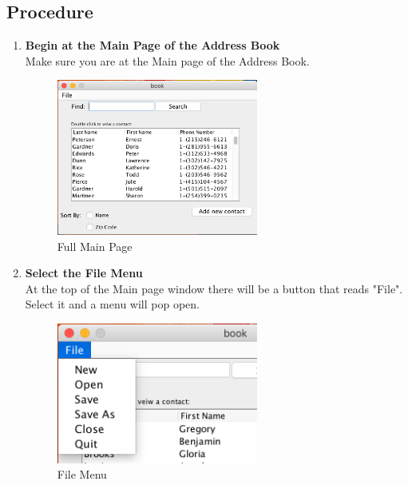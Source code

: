 \documentclass[a4paper, 11pt]{article}
\begin{document}
\subsection{Procedure}
\begin{enumerate}[label=\textbf{\arabic*})]
    \item{\textbf{Begin at the Main Page of the Address Book}}\\ Make sure you are at the Main page of the Address Book.
    
    \begin{figure}[h!]
    \centering
      \includegraphics[width=250]{main_page_full.png}
      \caption{Full Main Page}
    \end{figure}
    
    \item{\textbf{Select the File Menu}}\\ At the top of the Main page window there will be a button that reads "File". Select it and a menu will pop open.
    
    \begin{figure}[h!]
    \centering
      \includegraphics[width=250]{file_menu.png}
      \caption{File Menu}
    \end{figure}   
    

\end{enumerate}
\end{document}
